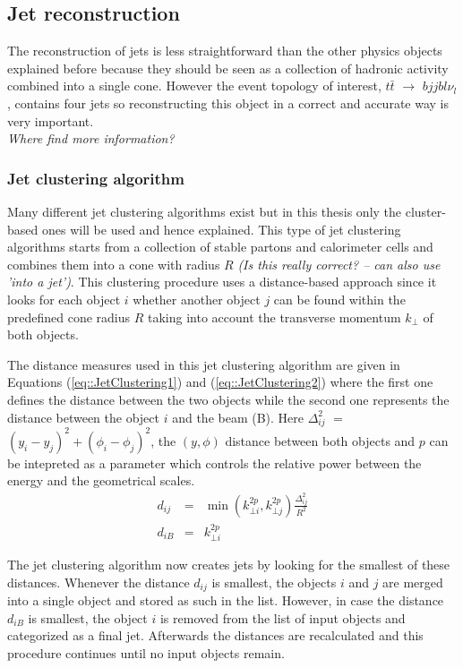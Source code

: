 \subsection{Jet reconstruction}
The reconstruction of jets is less straightforward than the other physics objects explained before because they should be seen as a collection of hadronic activity combined into a single cone. However the event topology of interest, $t\bar{t}$ $\rightarrow$ $bjjbl\nu_{l}$, contains four jets so reconstructing this object in a correct and accurate way is very important.
\\
\textit{Where find more information?}
 
\subsubsection*{Jet clustering algorithm}
Many different jet clustering algorithms exist but in this thesis only the cluster-based ones will be used and hence explained. This type of jet clustering algorithms starts from a collection of stable partons and calorimeter cells and combines them into a cone with radius $R$ \textit{(Is this really correct? --  can also use 'into a jet')}. This clustering procedure uses a distance-based approach since it looks for each object $i$ whether another object $j$ can be found within the predefined cone radius $R$ taking into account the transverse momentum $k_{\bot}$ of both objects.

The distance measures used in this jet clustering algorithm are given in Equations (\ref{eq::JetClustering1}) and (\ref{eq::JetClustering2}) where the first one defines the distance between the two objects while the second one represents the distance between the object $i$ and the beam (B). Here $\Delta_{ij}^{2}$ $=$ $(y_i - y_j)^{2} + (\phi_i - \phi_j)^2$, the $(y,\phi)$ distance between both objects and $p$ can be intepreted as a parameter which controls the relative power between the energy and the geometrical scales.
\begin{eqnarray}
 d_{ij} & = & \min(k_{\bot i}^{2p}, k_{\bot j}^{2p}) \frac{\Delta_{ij}^{2}}{R^{2}} \label{eq::JetClustering1} \\
 d_{iB} & = & k_{\bot i}^{2p}                                                      \label{eq::JetClustering2}
\end{eqnarray}

The jet clustering algorithm now creates jets by looking for the smallest of these distances. Whenever the distance $d_{ij}$ is smallest, the objects $i$ and $j$ are merged into a single object and stored as such in the list. However, in case the distance $d_{iB}$ is smallest, the object $i$ is removed from the list of input objects and categorized as a final jet. Afterwards the distances are recalculated and this procedure continues until no input objects remain.

